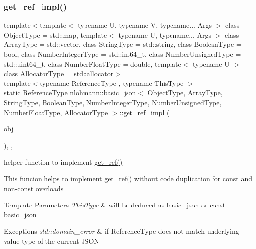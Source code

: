 \subsubsection{\texorpdfstring{get\+\_\+ref\+\_\+impl()}{get\_ref\_impl()}}
{\footnotesize\ttfamily template$<$template$<$ typename U, typename V, typename... Args $>$ class Object\+Type = std\+::map, template$<$ typename U, typename... Args $>$ class Array\+Type = std\+::vector, class String\+Type  = std\+::string, class Boolean\+Type  = bool, class Number\+Integer\+Type  = std\+::int64\+\_\+t, class Number\+Unsigned\+Type  = std\+::uint64\+\_\+t, class Number\+Float\+Type  = double, template$<$ typename U $>$ class Allocator\+Type = std\+::allocator$>$ \\
template$<$typename Reference\+Type , typename This\+Type $>$ \\
static Reference\+Type \hyperlink{classnlohmann_1_1basic__json}{nlohmann\+::basic\+\_\+json}$<$ Object\+Type, Array\+Type, String\+Type, Boolean\+Type, Number\+Integer\+Type, Number\+Unsigned\+Type, Number\+Float\+Type, Allocator\+Type $>$\+::get\+\_\+ref\+\_\+impl (\begin{DoxyParamCaption}\item[{This\+Type \&}]{obj }\end{DoxyParamCaption})\hspace{0.3cm}{\ttfamily [inline]}, {\ttfamily [static]}, {\ttfamily [private]}}



helper function to implement \hyperlink{classnlohmann_1_1basic__json_a4f332e90f3cae562d0c3fa6ba48f74f9}{get\+\_\+ref()} 

This funcion helps to implement \hyperlink{classnlohmann_1_1basic__json_a4f332e90f3cae562d0c3fa6ba48f74f9}{get\+\_\+ref()} without code duplication for const and non-\/const overloads


\begin{DoxyTemplParams}{Template Parameters}
{\em This\+Type} & will be deduced as {\ttfamily \hyperlink{classnlohmann_1_1basic__json}{basic\+\_\+json}} or {\ttfamily const \hyperlink{classnlohmann_1_1basic__json}{basic\+\_\+json}}\\
\hline
\end{DoxyTemplParams}

\begin{DoxyExceptions}{Exceptions}
{\em std\+::domain\+\_\+error} & if Reference\+Type does not match underlying value type of the current J\+S\+ON \\
\hline
\end{DoxyExceptions}
\hypertarget{classnlohmann_1_1basic__json_a7f7bbb3a9efef2e2442f538a24c1c47b}{}\label{classnlohmann_1_1basic__json_a7f7bbb3a9efef2e2442f538a24c1c47b} 
